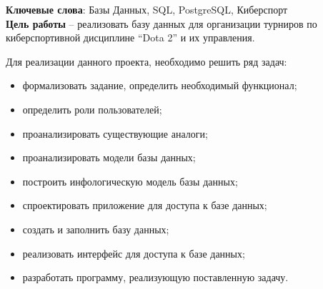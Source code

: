 
\noindent\textbf{Ключевые слова}: Базы Данных, SQL, PostgreSQL, Киберспорт\\


\textbf{Цель работы} – реализовать базу данных 	для организации турниров по киберспортивной дисциплине “Dota 2” и их управления.

Для реализации данного проекта, необходимо решить ряд задач:
\begin{itemize}
	\item формализовать задание, определить необходимый функционал;
	\item определить роли пользователей;
	\item проанализировать существующие аналоги;
	\item проанализировать модели базы данных;
	\item построить инфологическую модель базы данных;
	\item спроектировать приложение для доступа к базе данных;
	\item создать и заполнить базу данных;
	\item реализовать интерфейс для доступа к базе данных;
	\item разработать программу, реализующую поставленную задачу.
\end{itemize}

%
